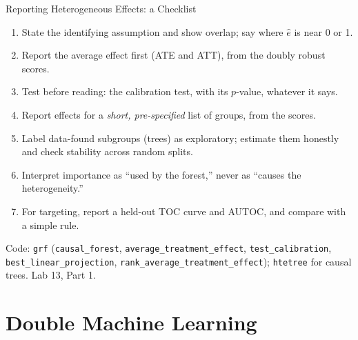 \documentclass[aspectratio=169,11pt,xcolor=dvipsnames]{beamer}
\newcommand{\core}{\,\raisebox{0.6pt}{\textcolor{corestar}{$\bigstar$}}}
\begin{document}
\begin{frame}{Reporting Heterogeneous Effects: a Checklist\core}
\begin{enumerate}\itemsep4pt
  \item State the identifying assumption and show overlap; say where $\hat e$ is near 0 or 1.
  \item Report the average effect first (ATE and ATT), from the doubly robust scores.
  \item Test before reading: the calibration test, with its $p$-value, whatever it says.
  \item Report effects for a \emph{short, pre-specified} list of groups, from the scores.
  \item Label data-found subgroups (trees) as exploratory; estimate them honestly and
        check stability across random splits.
  \item Interpret importance as ``used by the forest,'' never as ``causes the heterogeneity.''
  \item For targeting, report a held-out TOC curve and AUTOC, and compare with a simple rule.
\end{enumerate}
\vskip4pt
{\small Code: \texttt{grf} (\texttt{causal\_forest}, \texttt{average\_treatment\_effect},
\texttt{test\_calibration}, \texttt{best\_linear\_projection}, \texttt{rank\_average\_treatment\_effect});
\texttt{htetree} for causal trees. Lab 13, Part 1.}
\end{frame}

\section[DML]{Double Machine Learning}
\begin{frame}\sectionpage\end{frame}
\end{document}
